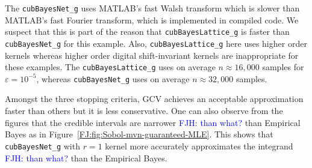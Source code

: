 \documentclass[graybox,footinfo]{svmult}
\newcommand{\FJHNote}[1]{{\textcolor{blue}{FJH: #1}}}
\begin{document}
The \texttt{cubBayesNet\_g} uses MATLAB's fast Walsh transform which is slower than MATLAB's fast Fourier transform, which is implemented in compiled code. We suspect that this is part of the reason that \texttt{cubBayesLattice\_g} is faster than \texttt{cubBayesNet\_g} for this example. Also, \texttt{cubBayesLattice\_g} here uses higher order kernels whereas higher order digital shift-invariant kernels are inappropriate for these examples. The \texttt{cubBayesLattice\_g} uses on average $n \approx 16{,}000$ samples for $\varepsilon = 10^{-5}$, whereas \texttt{cubBayesNet\_g} uses on average $n \approx 32{,}000$ samples.

Amongst the three stopping criteria, GCV achieves an acceptable approximation faster than others but it is less conservative. 
One can also observe from the figures that the credible intervals are narrower \FJHNote{than what?} than Empirical Bayes as in Figure~\ref{FJ:fig:Sobol-mvn-guaranteed-MLE}.
This shows that \texttt{cubBayesNet\_g} with $r=1$ kernel more accurately approximates the integrand \FJHNote{than what?} than the Empirical Bayes.
\end{document}
